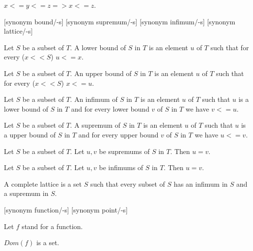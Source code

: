 \documentclass{article}
\begin{document}
\begin{forthel}
    \begin{axiom}[Trans]
      $x <= y <= z => x <= z$.
    \end{axiom}

    [synonym bound/-s] [synonym supremum/-s] [synonym infimum/-s]
    [synonym lattice/-s]

    \begin{definition}[DefLB]
      Let $S$ be a subset of $T$. A lower bound of $S$ in $T$ is an element $u$ of $T$ such that for every ($x << S$) $u <= x$.
    \end{definition}

    \begin{definition}[DefUB]
      Let $S$ be a subset of $T$. An upper bound of $S$ in $T$ is an element $u$ of $T$ such that for every ($x << S$) $x <= u$.
    \end{definition}

    \begin{definition}[DefInf]
      Let $S$ be a subset of $T$. An infimum of $S$ in $T$ is an element $u$ of $T$ such that $u$ is a lower bound of $S$ in $T$ and for every lower bound $v$ of $S$ in $T$ we have $v <= u$.
    \end{definition}

    \begin{definition}[DefSup]
      Let $S$ be a subset of $T$. A supremum of $S$ in $T$ is an element $u$ of $T$ such that $u$ is a upper bound of $S$ in $T$ and for every upper bound $v$ of $S$ in $T$ we have $u <= v$.
    \end{definition}

    \begin{lemma}[SupUn]
      Let $S$ be a subset of $T$. Let $u,v$ be supremums of $S$ in $T$. Then $u = v$.
    \end{lemma}

    \begin{lemma}[InfUn]
      Let $S$ be a subset of $T$. Let $u,v$ be infimums of $S$ in $T$. Then $u = v$.
    \end{lemma}

    \begin{definition}[DefCLat]
      A complete lattice is a set $S$ such that every subset of $S$ has an infimum in $S$ and a supremum in $S$.
    \end{definition}


    [synonym function/-s] [synonym point/-s]


    Let $f$ stand for a function.

    \begin{axiom}
      $Dom(f)$ is a set.
    \end{axiom}


\end{forthel}
\end{document}
